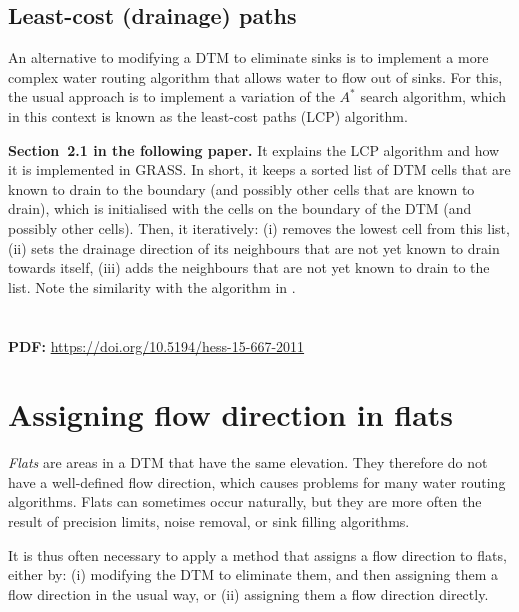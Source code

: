 \subsection{Least-cost (drainage) paths}

An alternative to modifying a DTM to eliminate sinks is to implement a more complex water routing algorithm that allows water to flow out of sinks.
For this, the usual approach is to implement a variation of the \(A^{*}\) search algorithm, which in this context is known as the least-cost paths (LCP) algorithm.

\begin{kaobox}[frametitle=\faExternalLink\ To read or to watch.]
\textbf{Section~2.1 in the following paper.} It explains the LCP algorithm and how it is implemented in GRASS\@.
In short, it keeps a sorted list of DTM cells that are known to drain to the boundary (and possibly other cells that are known to drain), which is initialised with the cells on the boundary of the DTM (and possibly other cells)\@.
Then, it iteratively: (i) removes the lowest cell from this list, (ii) sets the drainage direction of its neighbours that are not yet known to drain towards itself, (iii) adds the neighbours that are not yet known to drain to the list.
Note the similarity with the algorithm in \citet{Barnes14a}.
\\
\\
\\
\textbf{PDF:} \url{https://doi.org/10.5194/hess-15-667-2011}
\end{kaobox}


\section[Flow direction in flats]{Assigning flow direction in flats}

\emph{Flats} are areas in a DTM that have the same elevation.
They therefore do not have a well-defined flow direction, which causes problems for many water routing algorithms.
Flats can sometimes occur naturally, but they are more often the result of precision limits, noise removal, or sink filling algorithms.

It is thus often necessary to apply a method that assigns a flow direction to flats, either by: (i) modifying the DTM to eliminate them, and then assigning them a flow direction in the usual way, or (ii) assigning them a flow direction directly.

